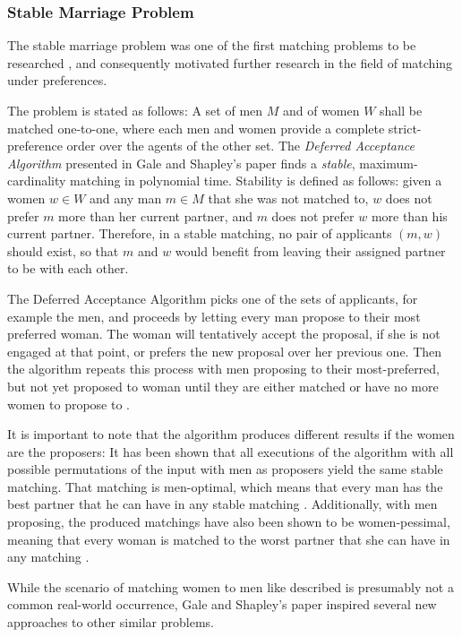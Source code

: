 \subsubsection{Stable Marriage Problem}\label{intro:stable-marriage}
The stable marriage problem was one of the first matching problems to be researched \cite{GaleShapleyOrig}, and consequently motivated further research in the field of matching under preferences.

The problem is stated as follows: A set of men $M$ and of women $W$ shall be matched one-to-one, where each men and women provide a complete strict-preference order over the agents of the other set. The \emph{Deferred Acceptance Algorithm} presented in Gale and Shapley's paper \cite{GaleShapleyOrig} finds a \emph{stable}, maximum-cardinality matching in polynomial time. Stability is defined as follows: given a women $w \in W$ and any man $m \in M$ that she was not matched to, $w$ does not prefer $m$ more than her current partner, and $m$ does not prefer $w$ more than his current partner. Therefore, in a stable matching, no pair of applicants $(m, w)$ should exist, so that $m$ and $w$ would benefit from leaving their assigned partner to be with each other.

The Deferred Acceptance Algorithm picks one of the sets of applicants, for example the men, and proceeds by letting every man propose to their most preferred woman. The woman will tentatively accept the proposal, if she is not engaged at that point, or prefers the new proposal over her previous one. Then the algorithm repeats this process with men proposing to their most-preferred, but not yet proposed to woman until they are either matched or have no more women to propose to \cite{Gusfield}.

It is important to note that the algorithm produces different results if the women are the proposers: It has been shown that all executions of the algorithm with all possible permutations of the input with men as proposers yield the same stable matching. That matching is men-optimal, which means that every man has the best partner that he can have in any stable matching \cite{Gusfield}. Additionally, with men proposing, the produced matchings have also been shown to be women-pessimal, meaning that every woman is matched to the worst partner that she can have in any matching \cite{Gusfield}.

While the scenario of matching women to men like described is presumably not a common real-world occurrence, Gale and Shapley's paper inspired several new approaches to other similar problems.

